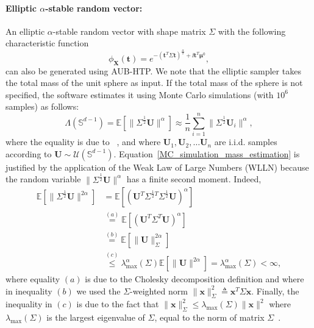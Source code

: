 \paragraph{Elliptic $\alpha$-stable random vector:} An elliptic $\alpha$-stable random vector with shape matrix $\Sigma$ with the following characteristic function
\[
    \phi_{\mathbf{X}}(\mathbf{t})=e^{-(\mathbf{t}^T\Sigma \mathbf{t})^{\frac{\alpha}{2}} +\ii\mathbf{t}^T\boldsymbol{\mu}^0},
\]
can also be generated using AUB-HTP. We note that the elliptic sampler takes the total mass of the unit sphere as input. If the total mass of the sphere is not specified, the software estimates it using Monte Carlo simulations (with $10^6$ samples) as follows:
\begin{equation}
    \label{MC_simulation_mass_estimation}
        \Lambda(\mathbb{S}^{d-1})=\mathbb{E}\left[\|\Sigma^{\frac{1}{2}}\mathbf{U}\|^{\alpha}\right]\approx\frac{1}{n}\sum_{i=1}^n\|\Sigma^{\frac{1}{2}}\mathbf{U}_i\|^{\alpha},
    \end{equation}
where the equality is due to~ \cite[proposition 2.5.8]{SamorodnitskyGennady2000Snrp}, and where  $\mathbf{U}_1,\mathbf{U}_2,\ldots\mathbf{U}_n$ are i.i.d. samples according to $\mathbf{U}\sim\mathcal{U}(\mathbb{S}^{d-1})$. Equation~\eqref{MC_simulation_mass_estimation} is justified by the application of the Weak Law of Large Numbers (WLLN) because the random variable $\|\Sigma^{\frac{1}{2}}\mathbf{U}\|^{\alpha}$ has a finite second moment. Indeed,
\begin{align}
        \mathbb{E}[\|\Sigma^{\frac{1}{2}}\mathbf{U}\|^{2\alpha}]&=\mathbb{E}\left[\left(\mathbf{U}^T\Sigma^{\frac{1}{2}T}\Sigma^{\frac{1}{2}}\mathbf{U}\right)^{\alpha}\right]\nonumber\\&\overset{(a)}=\mathbb{E}\left[\left(\mathbf{U}^T\Sigma^T\mathbf{U}\right)^{\alpha}\right]\label{cholesky}\\
&\overset{(b)}=\mathbb{E}\left[\|\mathbf{U}\|^{2\alpha}_{\Sigma}\right]\label{number}\\&\overset{(c)}\leq \lambda_{\text{max}}^{\alpha}(\Sigma)\mathbb{E}\left[\|\mathbf{U}\|^{2\alpha}\right]=\lambda_{\text{max}}^{\alpha}(\Sigma)<\infty,\label{eq:ineq}
\end{align}
where equality $(a)$ is due to the Cholesky decomposition definition and where in inequality $(b)$ we used the $\Sigma$-weighted norm $\|\mathbf{x}\|^2_{\Sigma}≜\mathbf{x}^T\Sigma\mathbf{x}$. Finally, the inequality in $(c)$ is due to the fact that $\|\mathbf{x}\|^2_{\Sigma}\leq\lambda_{\max}(\Sigma)\|\mathbf{x}\|^2$ where $\lambda_{\text{max}}(\Sigma)$ is the largest eigenvalue of $\Sigma$, equal to the norm of matrix $\Sigma$~\citep{alma991015644117709436}.

